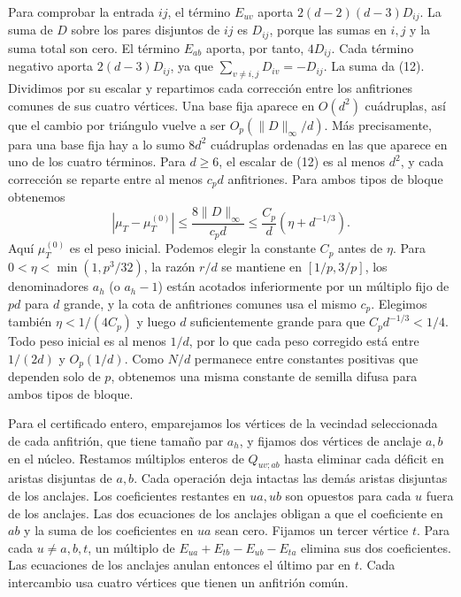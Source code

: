 \documentclass[spanish,11pt,a4paper]{article}
\begin{document}
Para comprobar la entrada \(ij\), el término \(E_{uv}\) aporta \(2(d-2)(d-3)D_{ij}\). La suma de \(D\) sobre los pares disjuntos de \(ij\) es \(D_{ij}\), porque las sumas en \(i,j\) y la suma total son cero. El término \(E_{ab}\) aporta, por tanto, \(4D_{ij}\). Cada término negativo aporta \(2(d-3)D_{ij}\), ya que \(\sum_{v\ne i,j}D_{iv}=-D_{ij}\). La suma da (12). Dividimos por su escalar y repartimos cada corrección entre los anfitriones comunes de sus cuatro vértices. Una base fija aparece en \(O(d^2)\) cuádruplas, así que el cambio por triángulo vuelve a ser \(O_p(\|D\|_\infty/d)\). Más precisamente, para una base fija hay a lo sumo \(8d^2\) cuádruplas ordenadas en las que aparece en uno de los cuatro términos. Para \(d\ge6\), el escalar de (12) es al menos \(d^2\), y cada corrección se reparte entre al menos \(c_pd\) anfitriones. Para ambos tipos de bloque obtenemos \[|\mu_T-\mu_T^{(0)}|\le \frac{8\|D\|_\infty}{c_pd}
 \le \frac{C_p}{d}(\eta+d^{-1/3}).\] Aquí \(\mu_T^{(0)}\) es el peso inicial. Podemos elegir la constante \(C_p\) antes de \(\eta\). Para \(0<\eta<\min(1,p^3/32)\), la razón \(r/d\) se mantiene en \([1/p,3/p]\), los denominadores \(a_h\) (o \(a_h-1\)) están acotados inferiormente por un múltiplo fijo de \(pd\) para \(d\) grande, y la cota de anfitriones comunes usa el mismo \(c_p\). Elegimos también \(\eta<1/(4C_p)\) y luego \(d\) suficientemente grande para que \(C_pd^{-1/3}<1/4\). Todo peso inicial es al menos \(1/d\), por lo que cada peso corregido está entre \(1/(2d)\) y \(O_p(1/d)\). Como \(N/d\) permanece entre constantes positivas que dependen solo de \(p\), obtenemos una misma constante de semilla difusa para ambos tipos de bloque.

Para el certificado entero, emparejamos los vértices de la vecindad seleccionada de cada anfitrión, que tiene tamaño par \(a_h\), y fijamos dos vértices de anclaje \(a,b\) en el núcleo. Restamos múltiplos enteros de \(Q_{uv;ab}\) hasta eliminar cada déficit en aristas disjuntas de \(a,b\). Cada operación deja intactas las demás aristas disjuntas de los anclajes. Los coeficientes restantes en \(ua,ub\) son opuestos para cada \(u\) fuera de los anclajes. Las dos ecuaciones de los anclajes obligan a que el coeficiente en \(ab\) y la suma de los coeficientes en \(ua\) sean cero. Fijamos un tercer vértice \(t\). Para cada \(u\ne a,b,t\), un múltiplo de \(E_{ua}+E_{tb}-E_{ub}-E_{ta}\) elimina sus dos coeficientes. Las ecuaciones de los anclajes anulan entonces el último par en \(t\). Cada intercambio usa cuatro vértices que tienen un anfitrión común.
\end{document}
